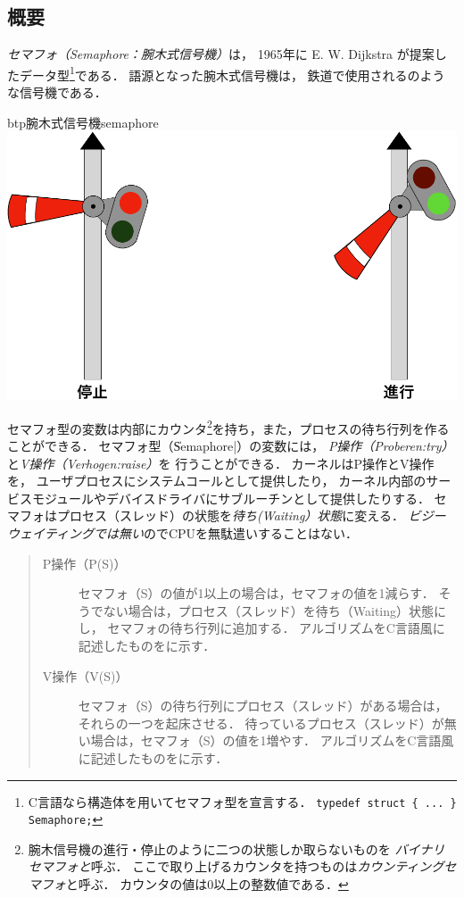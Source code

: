 \subsection{概要}
\emph{セマフォ（Semaphore：腕木式信号機）}は，
1965年に E. W. Dijkstra が提案したデータ型\footnote{
  C言語なら構造体を用いてセマフォ型を宣言する．
  \texttt{typedef struct \{ ... \} Semaphore;}
}である．
語源となった腕木式信号機は，
鉄道で使用されるのような信号機である．

\begin{myfig}{btp}{腕木式信号機}{semaphore}
  \includegraphics[scale=0.4]{Fig/semaphore-crop.pdf}
\end{myfig}

セマフォ型の変数は内部にカウンタ\footnote{
  腕木信号機の進行・停止のように二つの状態しか取らないものを
  \emph{バイナリセマフォと}呼ぶ．
  ここで取り上げるカウンタを持つものは\emph{カウンティングセマフォ}と呼ぶ．
  カウンタの値は0以上の整数値である．
}を持ち，また，プロセスの待ち行列を作ることができる．
セマフォ型（\|Semaphore|）の変数には，
\emph{P操作（Proberen:try）}と\emph{V操作（Verhogen:raise）}を
行うことができる．
カーネルはP操作とV操作を，
ユーザプロセスにシステムコールとして提供したり，
カーネル内部のサービスモジュールやデバイスドライバにサブルーチンとして提供したりする．
セマフォはプロセス（スレッド）の状態を\emph{待ち(Waiting）状態}に変える．
  \emph{ビジーウェイティングでは無い}のでCPUを無駄遣いすることはない．

\begin{quote}
  \begin{description}
  \item[P操作（P(S)）]
    セマフォ（S）の値が1以上の場合は，セマフォの値を1減らす．
    そうでない場合は，プロセス（スレッド）を待ち（Waiting）状態にし，
    セマフォの待ち行列に追加する．
    アルゴリズムをC言語風に記述したものをに示す．
  \item[V操作（V(S)）]
    セマフォ（S）の待ち行列にプロセス（スレッド）がある場合は，
    それらの一つを起床させる．
    待っているプロセス（スレッド）が無い場合は，セマフォ（S）の値を1増やす．
    アルゴリズムをC言語風に記述したものをに示す．
  \end{description}
\end{quote}

